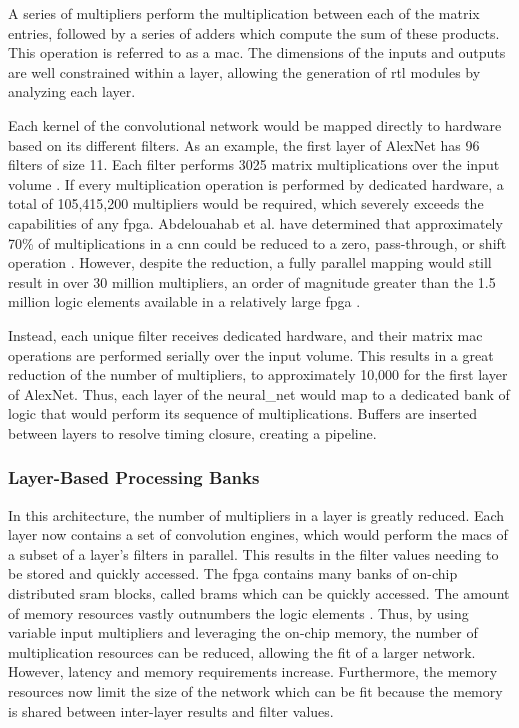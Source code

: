 \documentclass{uw-ece-wkrpt}
\begin{document}
A series of multipliers perform the multiplication between each of the matrix entries, followed by a series of adders which compute the sum of these products. This operation is referred to as a \gls{mac}. The dimensions of the inputs and outputs are well constrained within a layer, allowing the generation of \gls{rtl} modules by analyzing each layer.

Each \gls{kernel} of the convolutional network would be mapped directly to hardware based on its different \glspl{filter}. As an example, the first layer of AlexNet has 96 \glspl{filter} of size 11. Each \gls{filter} performs 3025 matrix multiplications over the input volume \cite{Krizhevsky2017ImageNet-Classi}. If every multiplication operation is performed by dedicated hardware, a total of 105,415,200 multipliers would be required, which severely exceeds the capabilities of any \gls{fpga}. Abdelouahab et al. have determined that approximately 70\% of multiplications in a \gls{cnn} could be reduced to a zero, pass-through, or shift operation \cite{Abdelouahab2017Hardware-Automa}. However, despite the reduction, a fully parallel mapping would still result in over 30 million multipliers, an order of magnitude greater than the 1.5 million logic elements available in a relatively large \gls{fpga} \cite{Intel-Corp.2018IntelR-ArriaR-1}.

Instead, each unique \gls{filter} receives dedicated hardware, and their matrix \gls{mac} operations are performed serially over the input volume. This results in a great reduction of the number of multipliers, to approximately 10,000 for the first layer of AlexNet. Thus, each layer of the \gls{neural_net} would map to a dedicated bank of logic that would perform its sequence of multiplications. Buffers are inserted between layers to resolve timing closure, creating a pipeline.

\subsubsection{Layer-Based Processing Banks}

In this architecture, the number of multipliers in a layer is greatly reduced. Each layer now contains a set of convolution engines, which would perform the \glspl{mac} of a subset of a layer's \glspl{filter} in parallel. This results in the \gls{filter} values needing to be stored and quickly accessed. The \gls{fpga} contains many banks of on-chip distributed \gls{sram} blocks, called \glspl{bram} which can be quickly accessed. The amount of memory resources vastly outnumbers the logic elements \cite{Intel-Corp.2018IntelR-ArriaR-1}. Thus, by using variable input multipliers and leveraging the on-chip memory, the number of multiplication resources can be reduced, allowing the fit of a larger network. However, latency and memory requirements increase. Furthermore, the memory resources now limit the size of the network which can be fit because the memory is shared between inter-layer results and \gls{filter} values.
\end{document}
